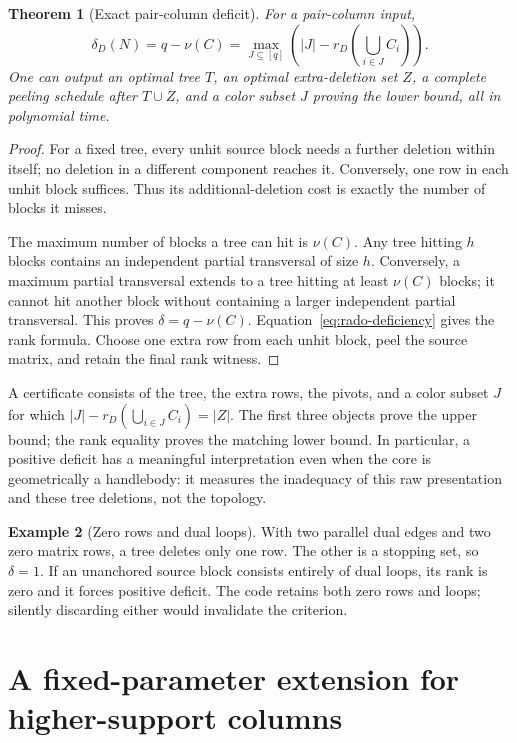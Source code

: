 \documentclass[11pt,letterpaper]{article}
\newtheorem{theorem}{Theorem}[section]
\theoremstyle{definition}
\newtheorem{example}[theorem]{Example}
\theoremstyle{remark}
\begin{document}
\begin{theorem}[Exact pair-column deficit]\label{thm:deficit}
For a pair-column input,
\begin{equation}\label{eq:deficit}
 \boxed{\displaystyle
 \delta_D(N)=q-\nu(C)
 =\max_{J\subseteq[q]}\left(|J|-r_D\!\left(\bigcup_{i\in J}C_i\right)\right).}
\end{equation}
One can output an optimal tree $T$, an optimal extra-deletion set $Z$, a complete
peeling schedule after $T\cup Z$, and a color subset $J$ proving the lower bound,
all in polynomial time.
\end{theorem}
\begin{proof}
For a fixed tree, every unhit source block needs a further deletion within itself;
no deletion in a different component reaches it. Conversely, one row in each
unhit block suffices. Thus its additional-deletion cost is exactly the number of
blocks it misses.

The maximum number of blocks a tree can hit is $\nu(C)$. Any tree hitting $h$
blocks contains an independent partial transversal of size $h$. Conversely,
a maximum partial transversal extends to a tree hitting at least $\nu(C)$ blocks;
it cannot hit another block without containing a larger independent partial
transversal. This proves $\delta=q-\nu(C)$. Equation~\eqref{eq:rado-deficiency}
gives the rank formula. Choose one extra row from each unhit block, peel the
source matrix, and retain the final rank witness.
\end{proof}

A certificate consists of the tree, the extra rows, the pivots, and a color
subset $J$ for which $|J|-r_D(\bigcup_{i\in J}C_i)=|Z|$. The first three objects
prove the upper bound; the rank equality proves the matching lower bound. In
particular, a positive deficit has a meaningful interpretation even when the
core is geometrically a handlebody: it measures the inadequacy of this raw
presentation and these tree deletions, not the topology.

\begin{example}[Zero rows and dual loops]
With two parallel dual edges and two zero matrix rows, a tree deletes only one
row. The other is a stopping set, so $\delta=1$. If an unanchored source block
consists entirely of dual loops, its rank is zero and it forces positive deficit.
The code retains both zero rows and loops; silently discarding either would
invalidate the criterion.
\end{example}

\section{A fixed-parameter extension for higher-support columns}\label{sec:fpt}
\end{document}
